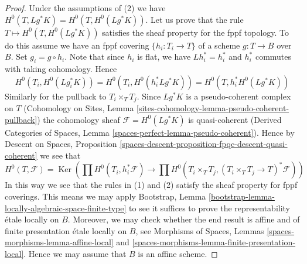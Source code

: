 \documentclass{stacks-project}
\theoremstyle{plain}
\theoremstyle{definition}
\theoremstyle{remark}
\numberwithin{equation}{subsection}
\def\Ker{\mathop{\mathrm{Ker}}}
\begin{document}
\begin{proof}
Under the assumptions of (2) we have $H^0(T, Lg^*K) = H^0(T, H^0(Lg^*K))$.
Let us prove that the rule $T \mapsto H^0(T, H^0(Lg^*K))$ satisfies the
sheaf property for the fppf topology. To do this assume we have an
fppf covering $\{h_i : T_i \to T\}$ of a scheme $g : T \to B$ over $B$.
Set $g_i = g \circ h_i$. Note that since $h_i$ is flat, we have
$Lh_i^* = h_i^*$ and $h_i^*$ commutes with taking cohomology. Hence
$$
H^0(T_i, H^0(Lg_i^*K)) =
H^0(T_i, H^0(h_i^*Lg^*K)) =
H^0(T, h_i^*H^0(Lg^*K))
$$
Similarly for the pullback to $T_i \times_T T_j$.
Since $Lg^*K$ is a pseudo-coherent complex on $T$
(Cohomology on Sites, Lemma
\ref{sites-cohomology-lemma-pseudo-coherent-pullback})
the cohomology sheaf $\mathcal{F} = H^0(Lg^*K)$ is quasi-coherent
(Derived Categories of Spaces, Lemma
\ref{spaces-perfect-lemma-pseudo-coherent}).
Hence by Descent on Spaces, Proposition
\ref{spaces-descent-proposition-fpqc-descent-quasi-coherent}
we see that
$$
H^0(T, \mathcal{F}) = \Ker(
\prod H^0(T_i, h_i^*\mathcal{F}) \to
\prod H^0(T_i \times_T T_j, (T_i \times_T T_j \to T)^*\mathcal{F}))
$$
In this way we see that the rules in (1) and (2) satisfy
the sheaf property for fppf coverings. This means we may apply
Bootstrap, Lemma \ref{bootstrap-lemma-locally-algebraic-space-finite-type}
to see it suffices to prove the representability \'etale locally on $B$.
Moreover, we may check whether the end result is affine and
of finite presentation \'etale locally on $B$, see
Morphisms of Spaces, Lemmas \ref{spaces-morphisms-lemma-affine-local} and
\ref{spaces-morphisms-lemma-finite-presentation-local}.
Hence we may assume that $B$ is an affine scheme.


\end{proof}
\end{document}
